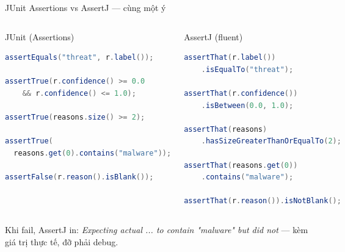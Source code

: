 \documentclass[aspectratio=169,12pt]{beamer}
\begin{document}
\begin{frame}[fragile,shrink=8]{JUnit Assertions vs AssertJ --- cùng một ý}
  \begin{columns}
    \begin{block}{JUnit (Assertions)}
\begin{lstlisting}[language=java,style=nonumber]
assertEquals("threat", r.label());

assertTrue(r.confidence() >= 0.0
    && r.confidence() <= 1.0);

assertTrue(reasons.size() >= 2);

assertTrue(
  reasons.get(0).contains("malware"));

assertFalse(r.reason().isBlank());
\end{lstlisting}
    \end{block}

    \begin{block}{AssertJ (fluent)}
\begin{lstlisting}[language=java,style=nonumber]
assertThat(r.label())
    .isEqualTo("threat");

assertThat(r.confidence())
    .isBetween(0.0, 1.0);

assertThat(reasons)
    .hasSizeGreaterThanOrEqualTo(2);

assertThat(reasons.get(0))
    .contains("malware");

assertThat(r.reason()).isNotBlank();
\end{lstlisting}
    \end{block}
  \end{columns}

  \vspace{0.2em}
  {\small Khi fail, AssertJ in: \textit{Expecting actual ... to contain
  "malware" but did not} --- kèm giá trị thực tế, đỡ phải debug.}
\end{frame}
\end{document}

